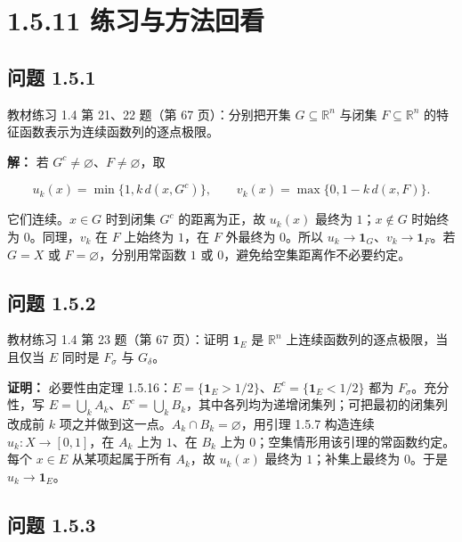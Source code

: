 \documentclass[11pt,a4paper]{article}
\begin{document}
\section[\S{}1.5.11
练习与方法回看]{1.5.11
练习与方法回看}\label{ux7ec3ux4e60ux4e0eux65b9ux6cd5ux56deux770b}

\subsection{问题 1.5.1}\label{ux95eeux9898-1.5.1}

教材练习 1.4 第 21、22 题（第 67 页）：分别把开集
\(G\subseteq\mathbb R^n\) 与闭集 \(F\subseteq\mathbb R^n\)
的特征函数表示为连续函数列的逐点极限。

\textbf{解：} 若 \(G^c\ne\varnothing\)、\(F\ne\varnothing\)，取

\begin{equation*}
u_k(x)=\min\{1,k\,d(x,G^c)\},\qquad
v_k(x)=\max\{0,1-k\,d(x,F)\}.
\tag{1.5.20}
\end{equation*}

它们连续。\(x\in G\) 时到闭集 \(G^c\) 的距离为正，故 \(u_k(x)\) 最终为
\(1\)；\(x\notin G\) 时始终为 \(0\)。同理，\(v_k\) 在 \(F\) 上始终为
\(1\)，在 \(F\) 外最终为 \(0\)。所以
\(u_k\to\mathbf1_G\)、\(v_k\to\mathbf1_F\)。若 \(G=X\) 或
\(F=\varnothing\)，分别用常函数 \(1\) 或
\(0\)，避免给空集距离作不必要约定。

\subsection{问题 1.5.2}\label{ux95eeux9898-1.5.2}

教材练习 1.4 第 23 题（第 67 页）：证明 \(\mathbf1_E\) 是
\(\mathbb R^n\) 上连续函数列的逐点极限，当且仅当 \(E\) 同时是
\(F_\sigma\) 与 \(G_\delta\)。

\textbf{证明：} 必要性由定理
1.5.16：\(E=\{\mathbf1_E>1/2\}\)、\(E^c=\{\mathbf1_E<1/2\}\) 都为
\(F_\sigma\)。充分性，写
\(E=\bigcup_kA_k\)、\(E^c=\bigcup_kB_k\)，其中各列均为递增闭集列；可把最初的闭集列改成前
\(k\) 项之并做到这一点。\(A_k\cap B_k=\varnothing\)，用引理 1.5.7
构造连续 \(u_k:X\to[0,1]\)，在 \(A_k\) 上为 \(1\)、在 \(B_k\) 上为
\(0\)；空集情形用该引理的常函数约定。每个 \(x\in E\) 从某项起属于所有
\(A_k\)，故 \(u_k(x)\) 最终为 \(1\)；补集上最终为 \(0\)。于是
\(u_k\to\mathbf1_E\)。

\subsection{问题 1.5.3}\label{ux95eeux9898-1.5.3}
\end{document}
